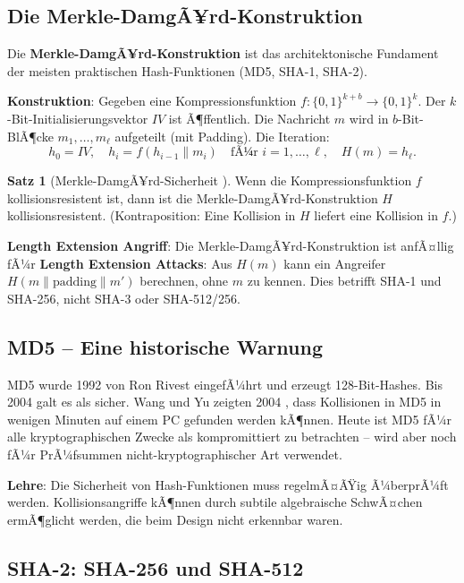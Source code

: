 ﻿\documentclass[a4paper,12pt]{scrreprt}
\theoremstyle{definition}
\newtheorem{satz}{Satz}[section]
\begin{document}
\subsection{Die Merkle-DamgÃ¥rd-Konstruktion}

Die \textbf{Merkle-DamgÃ¥rd-Konstruktion} \cite{Dam89,Mer89} ist das architektonische Fundament der meisten praktischen Hash-Funktionen (MD5, SHA-1, SHA-2).

\textbf{Konstruktion}: Gegeben eine Kompressionsfunktion $f: \{0,1\}^{k+b} \to \{0,1\}^k$. Der $k$-Bit-Initialisierungsvektor $IV$ ist Ã¶ffentlich. Die Nachricht $m$ wird in $b$-Bit-BlÃ¶cke $m_1,\ldots,m_\ell$ aufgeteilt (mit Padding). Die Iteration:
\[
h_0 = IV, \quad h_i = f(h_{i-1} \| m_i) \quad \text{fÃ¼r } i = 1,\ldots,\ell, \quad H(m) = h_\ell.
\]

\begin{satz}[Merkle-DamgÃ¥rd-Sicherheit \cite{Dam89,Mer89}]
Wenn die Kompressionsfunktion $f$ kollisionsresistent ist, dann ist die Merkle-DamgÃ¥rd-Konstruktion $H$ kollisionsresistent. (Kontraposition: Eine Kollision in $H$ liefert eine Kollision in $f$.)
\end{satz}

\textbf{Length Extension Angriff}: Die Merkle-DamgÃ¥rd-Konstruktion ist anfÃ¤llig fÃ¼r \textbf{Length Extension Attacks}: Aus $H(m)$ kann ein Angreifer $H(m \| \text{padding} \| m')$ berechnen, ohne $m$ zu kennen. Dies betrifft SHA-1 und SHA-256, nicht SHA-3 oder SHA-512/256.

\subsection{MD5 -- Eine historische Warnung}

MD5 wurde 1992 von Ron Rivest eingefÃ¼hrt und erzeugt 128-Bit-Hashes. Bis 2004 galt es als sicher. Wang und Yu zeigten 2004 \cite{WY05}, dass Kollisionen in MD5 in wenigen Minuten auf einem PC gefunden werden kÃ¶nnen. Heute ist MD5 fÃ¼r alle kryptographischen Zwecke als kompromittiert zu betrachten -- wird aber noch fÃ¼r PrÃ¼fsummen nicht-kryptographischer Art verwendet.

\textbf{Lehre}: Die Sicherheit von Hash-Funktionen muss regelmÃ¤ÃŸig Ã¼berprÃ¼ft werden. Kollisionsangriffe kÃ¶nnen durch subtile algebraische SchwÃ¤chen ermÃ¶glicht werden, die beim Design nicht erkennbar waren.

\subsection{SHA-2: SHA-256 und SHA-512}
\end{document}
